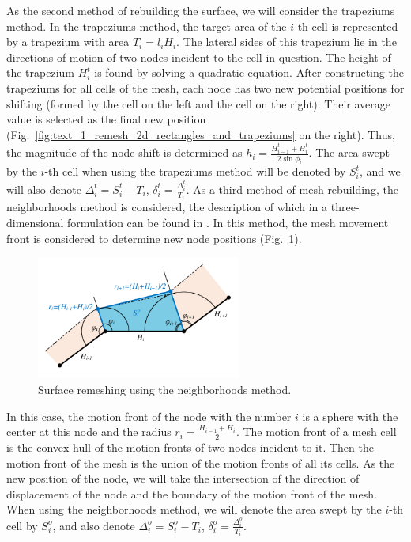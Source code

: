 \documentclass[
11pt,%
tightenlines,%
twoside,%
onecolumn,%
nofloats,%
nobibnotes,%
nofootinbib,%
superscriptaddress,%
noshowpacs,%
centertags]%
{revtex4}
\begin{document}
As the second method of rebuilding the surface, we will consider the trapeziums method.
In the trapeziums method, the target area of the $i$-th cell is represented by a trapezium with area $T_i = l_i H_i$.
The lateral sides of this trapezium lie in the directions of motion of two nodes incident to the cell in question.
The height of the trapezium $H_i^t$ is found by solving a quadratic equation.
After constructing the trapeziums for all cells of the mesh, each node has two new potential positions for shifting (formed by the cell on the left and the cell on the right).
Their average value is selected as the final new position (Fig.~\ref{fig:text_1_remesh_2d_rectangles_and_trapeziums} on the right).
Thus, the magnitude of the node shift is determined as $h_i = \frac{H_{i - 1}^t + H_i^t}{2 \sin \phi_i}$.
The area swept by the $i$-th cell when using the trapeziums method will be denoted by $S_i^t$, and we will also denote $\Delta_i^t = S_i^t - T_i$, $\delta_i^t = \frac{\Delta_i^t}{T_i}$.
As a third method of mesh rebuilding, the neighborhoods method is considered, the description of which in a three-dimensional formulation can be found in \cite{Meshcheryakov}.
In this method, the mesh movement front is considered to determine new node positions (Fig.~\ref{fig:text_1_remesh_2d_okrestnost}).

\begin{figure}[ht]
\setcaptionmargin{5mm}
\onelinecaptionstrue  %
\includegraphics[width=0.6\textwidth]{pics/remesh_okrestnost.pdf}
\caption{Surface remeshing using the neighborhoods method.}
\label{fig:text_1_remesh_2d_okrestnost}
\end{figure}

In this case, the motion front of the node with the number $i$ is a sphere with the center at this node and the radius $r_i = \frac{H_{i - 1} + H_i}{2}$.
The motion front of a mesh cell is the convex hull of the motion fronts of two nodes incident to it.
Then the motion front of the mesh is the union of the motion fronts of all its cells.
As the new position of the node, we will take the intersection of the direction of displacement of the node and the boundary of the motion front of the mesh.
When using the neighborhoods method, we will denote the area swept by the $i$-th cell by $S_i^o$, and also denote $\Delta_i^o = S_i^o - T_i$, $\delta_i^o = \frac{\Delta_i^o}{T_i}$.
\end{document}
